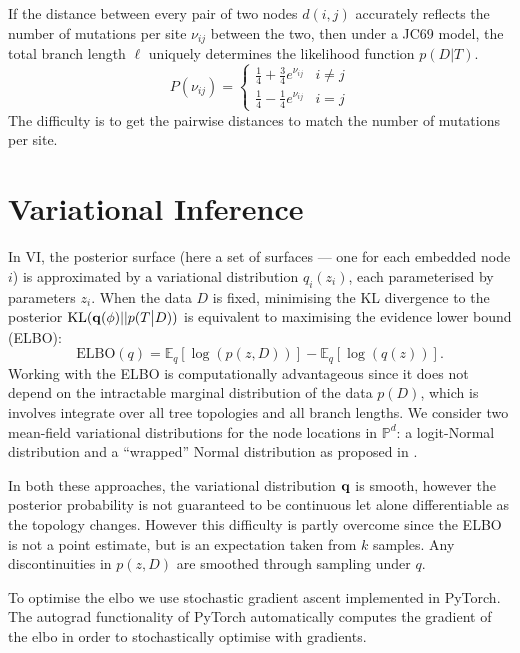 \documentclass[11pt]{article}
\newcommand{\be}{\begin{equation*}}
\newcommand{\ee}{\end{equation*}}
\newcommand{\bee}{\begin{eqnarray*}}
\newcommand{\eee}{\end{eqnarray*}}
\begin{document}
If the distance between every pair of two nodes $d(i,j)$ accurately reflects the number of mutations per site $\nu_{ij}$ between the two, then under a JC69 model, the total branch length $\ell$ uniquely determines the likelihood function $p(D|T)$.
\[
P(\nu_{ij}) = 
\begin{cases}
	\frac{1}{4} + \frac{3}{4} e^{\nu_{ij}} & i \neq j\\
	\frac{1}{4} - \frac{1}{4} e^{\nu_{ij}} & i = j
\end{cases}
\]
The difficulty is to get the pairwise distances to match the number of mutations per site.

\section{Variational Inference}
In VI, the posterior surface (here a set of surfaces --- one for each embedded node $i$) is approximated by a variational distribution $q_{i}(z_{i})$, each parameterised by parameters $z_{i}$.
When the data $D$ is fixed, minimising the KL divergence to the posterior $\text{KL}({\bf q}(\phi)||p(T\big|D))$ is equivalent to maximising the evidence lower bound (ELBO):
\be
\text{ELBO}(q) = \mathbb{E}_{q}[\log(p(z,D))] - \mathbb{E}_{q}[\log(q(z))].
\ee
Working with the ELBO is computationally advantageous since it does not depend on the intractable marginal distribution of the data $p(D)$, which is involves integrate over all tree topologies and all branch lengths.
We consider two mean-field variational distributions for the node locations in $\mathbb{P}^{d}$: a logit-Normal distribution and a ``wrapped'' Normal distribution as proposed in \cite{Nagano2019Wrapped}.

In both these approaches, the variational distribution $\bold{q}$ is smooth, however the posterior probability is not guaranteed to be continuous let alone differentiable as the topology changes.
However this difficulty is partly overcome since the ELBO is not a point estimate, but is an expectation taken from $k$ samples.
Any discontinuities in $p(z,D)$ are smoothed through sampling under $q$.

To optimise the elbo we use stochastic gradient ascent implemented in PyTorch.
The autograd functionality of PyTorch automatically computes the gradient of the elbo in order to stochastically optimise with gradients.
\end{document}
